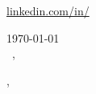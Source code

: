 \documentclass[12pt]{letter}
\begin{document}
\AddToShipoutPictureBG{%
\color{gr}
\AtPageUpperLeft{\rule[-1.3in]{\paperwidth}{1.3in}}
}

\begin{center}
{\fontsize{28}{0}\selectfont\scshape \myname}

\href{mailto:\myemail}{\faEnvelope\enspace \myemail}\hfill
\href{https://linkedin.com/in/\mylinkedin}{\faLinkedinIn\enspace linkedin.com/in/\mylinkedin}\hfill
\href{tel:\myphone}{\faPhone\enspace \myphone}\hfill
\faMapMarker\enspace \mylocation
\end{center}

\vspace{0.2in}

\today\\

\vspace{-0.1in}\greeting\ \recipient,\\

\vspace{-0.1in}\setlength\parindent{24pt}
\noindent

\vspace{0.1in}
\vfill

\begin{flushright}
\closer,

\myname\\
\mytitle
\end{flushright}
\end{document}
